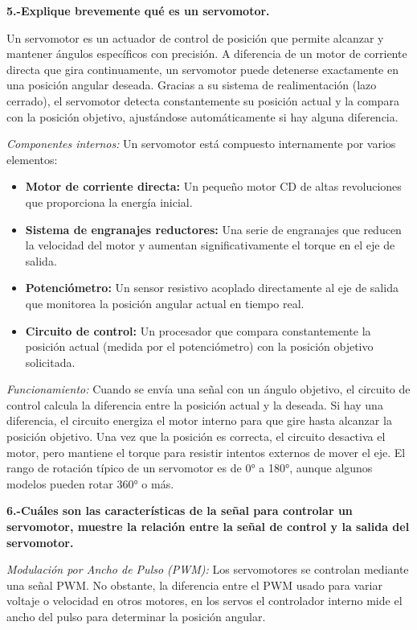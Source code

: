\documentclass[letterpaper,12pt]{article}
\begin{document}
    \noindent\textbf{5.-Explique brevemente qué es un servomotor.}

    Un servomotor es un actuador de control de posición que permite alcanzar y mantener ángulos específicos con precisión. A diferencia de un motor de corriente directa que gira continuamente, un servomotor puede detenerse exactamente en una posición angular deseada. Gracias a su sistema de realimentación (lazo cerrado), el servomotor detecta constantemente su posición actual y la compara con la posición objetivo, ajustándose automáticamente si hay alguna diferencia.

    \textit{Componentes internos:} Un servomotor está compuesto internamente por varios elementos:

    \begin{itemize}
        \item \textbf{Motor de corriente directa:} Un pequeño motor CD de altas revoluciones que proporciona la energía inicial.
        \item \textbf{Sistema de engranajes reductores:} Una serie de engranajes que reducen la velocidad del motor y aumentan significativamente el torque en el eje de salida.
        \item \textbf{Potenciómetro:} Un sensor resistivo acoplado directamente al eje de salida que monitorea la posición angular actual en tiempo real.
        \item \textbf{Circuito de control:} Un procesador que compara constantemente la posición actual (medida por el potenciómetro) con la posición objetivo solicitada.
    \end{itemize}

    \textit{Funcionamiento:} Cuando se envía una señal con un ángulo objetivo, el circuito de control calcula la diferencia entre la posición actual y la deseada. Si hay una diferencia, el circuito energiza el motor interno para que gire hasta alcanzar la posición objetivo. Una vez que la posición es correcta, el circuito desactiva el motor, pero mantiene el torque para resistir intentos externos de mover el eje. El rango de rotación típico de un servomotor es de 0° a 180°, aunque algunos modelos pueden rotar 360° o más.

    
    \noindent\textbf{6.-Cuáles son las características de la señal para controlar un servomotor, muestre la relación entre la señal de control y la salida del servomotor.}

    \textit{Modulación por Ancho de Pulso (PWM):} Los servomotores se controlan mediante una señal PWM. 
    No obstante, la diferencia entre el PWM usado para variar voltaje o velocidad en otros motores, 
    en los servos el controlador interno mide el ancho del pulso para determinar la posición angular.
\end{document}
